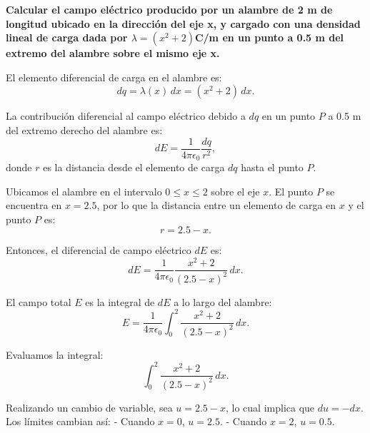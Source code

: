\documentclass[12pt, answers]{exam} %
\begin{document}
\begin{questions}
\begin{center}
      \end{center}
    

    \question \large\textbf{Calcular el campo eléctrico producido por un alambre de 2 m de longitud ubicado en la dirección del eje x, y cargado con una densidad lineal de carga dada por $\lambda = (x^2 + 2)$C/m en un punto a 0.5 m del extremo del alambre sobre el mismo eje x.}

    
    
    
    El elemento diferencial de carga en el alambre es:
    \[
    dq = \lambda(x) \, dx = (x^2 + 2) \, dx.
    \]
    
    La contribución diferencial al campo eléctrico debido a \(dq\) en un punto \(P\) a 0.5 m del extremo derecho del alambre es:
    \[
    dE = \frac{1}{4 \pi \epsilon_0} \frac{dq}{r^2},
    \]
    donde \(r\) es la distancia desde el elemento de carga \(dq\) hasta el punto \(P\).
    
 
    
    Ubicamos el alambre en el intervalo \(0 \leq x \leq 2\) sobre el eje \(x\). El punto \(P\) se encuentra en \(x = 2.5\), por lo que la distancia entre un elemento de carga en \(x\) y el punto \(P\) es:
    \[
    r = 2.5 - x.
    \]
    
    Entonces, el diferencial de campo eléctrico \(dE\) es:
    \[
    dE = \frac{1}{4 \pi \epsilon_0} \frac{x^2 + 2}{(2.5 - x)^2} \, dx.
    \]
    
    El campo total \(E\) es la integral de \(dE\) a lo largo del alambre:
    \[
    E = \frac{1}{4 \pi \epsilon_0} \int_0^2 \frac{x^2 + 2}{(2.5 - x)^2} \, dx.
    \]
    

    
    Evaluamos la integral:
    \[
    \int_0^2 \frac{x^2 + 2}{(2.5 - x)^2} \, dx.
    \]
    
    Realizando un cambio de variable, sea \(u = 2.5 - x\), lo cual implica que \(du = -dx\). Los límites cambian así:
    - Cuando \(x = 0\), \(u = 2.5\).
    - Cuando \(x = 2\), \(u = 0.5\).
    

\end{questions}
\end{document}
